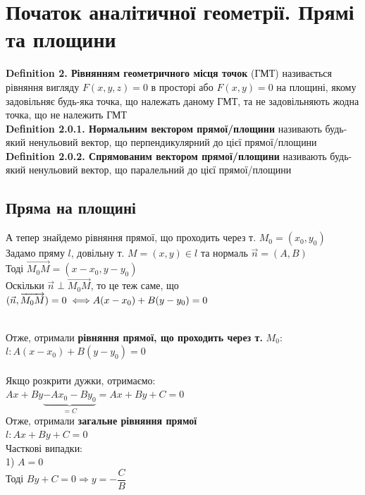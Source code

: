 \documentclass[a4paper, 14pt]{extarticle}
\def\defin#1{\textbf{Definition {#1}}}
\def\bigline{\vspace{5mm}\\}
\begin{document}
\section{Початок аналітичної геометрії. Прямі та площини}
\defin{2. Рівнянням геометричного місця точок} (ГМТ) називається рівняння вигляду $F(x,y,z) = 0$ в просторі або $F(x,y) = 0$ на площині, якому задовільняє будь-яка точка, що належать даному ГМТ, та не задовільняють жодна точка, що не належить ГМТ
\bigline
\defin{2.0.1. Нормальним вектором прямої/площини} називають будь-який ненульовий вектор, що перпендикулярний до цієї прямої/площини
\bigline
\defin{2.0.2. Спрямованим вектором прямої/площини} називають будь-який ненульовий вектор, що паралельний до цієї прямої/площини\\

\subsection{Пряма на площині}
А тепер знайдемо рівняння прямої, що проходить через т. $M_0 = (x_0,y_0)$\\
Задамо пряму $l$, довільну т. $M = (x,y) \in l$ та нормаль $\vec{n} = (A,B)$\\
Тоді $\overrightarrow{M_0M} = (x-x_0, y-y_0)$\\
Оскільки $\vec{n} \perp \overrightarrow{M_0 M}$, то це теж саме, що $(\vec{n}, \overrightarrow{M_0 M}) = 0 \iff \\ A(x-x_0)+B(y-y_0)=0$\\
\\
Отже, отримали \textbf{рівняння прямої, що проходить через т.} $M_0$:\\
$l: A(x-x_0) + B(y-y_0) = 0$
\bigline
\\
Якщо розкрити дужки, отримаємо:\\
$Ax + By \underbrace{-Ax_0 - By_0}_{= C} = Ax+By+C = 0$\\
Отже, отримали \textbf{загальне рівняння прямої}\\
$l: Ax + By + C = 0$
\bigline
Часткові випадки:\\
1) $A = 0$\\
Тоді $By + C = 0 \Rightarrow y = -\dfrac{C}{B}$\\
\end{document}
